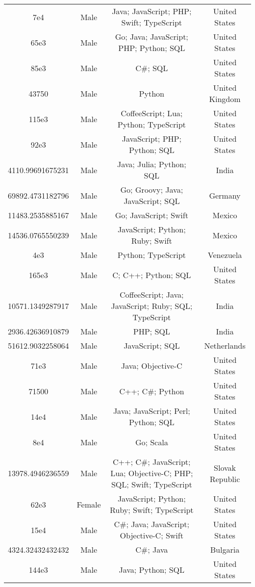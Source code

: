 \begin{center}
\begin{tabular}{ |c|c|c|c| }
7e4  &  Male  &  Java; JavaScript; PHP; Swift; TypeScript  &  United States  \\ 
65e3  &  Male  &  Go; Java; JavaScript; PHP; Python; SQL  &  United States  \\ 
85e3  &  Male  &  C\#; SQL  &  United States  \\ 
43750  &  Male  &  Python  &  United Kingdom  \\ 
115e3  &  Male  &  CoffeeScript; Lua; Python; TypeScript  &  United States  \\ 
92e3  &  Male  &  JavaScript; PHP; Python; SQL  &  United States  \\ 
4110.99691675231  &  Male  &  Java; Julia; Python; SQL  &  India  \\ 
69892.4731182796  &  Male  &  Go; Groovy; Java; JavaScript; SQL  &  Germany  \\ 
11483.2535885167  &  Male  &  Go; JavaScript; Swift  &  Mexico  \\ 
14536.0765550239  &  Male  &  JavaScript; Python; Ruby; Swift  &  Mexico  \\ 
4e3  &  Male  &  Python; TypeScript  &  Venezuela  \\ 
165e3  &  Male  &  C; C++; Python; SQL  &  United States  \\ 
10571.1349287917  &  Male  &  CoffeeScript; Java; JavaScript; Ruby; SQL; TypeScript  &  India  \\ 
2936.42636910879  &  Male  &  PHP; SQL  &  India  \\ 
51612.9032258064  &  Male  &  JavaScript; SQL  &  Netherlands  \\ 
71e3  &  Male  &  Java; Objective-C  &  United States  \\ 
71500  &  Male  &  C++; C\#; Python  &  United States  \\ 
14e4  &  Male  &  Java; JavaScript; Perl; Python; SQL  &  United States  \\ 
8e4  &  Male  &  Go; Scala  &  United States  \\ 
13978.4946236559  &  Male  &  C++; C\#; JavaScript; Lua; Objective-C; PHP; SQL; Swift; TypeScript  &  Slovak Republic  \\ 
62e3  &  Female  &  JavaScript; Python; Ruby; Swift; TypeScript  &  United States  \\ 
15e4  &  Male  &  C\#; Java; JavaScript; Objective-C; Swift  &  United States  \\ 
4324.32432432432  &  Male  &  C\#; Java  &  Bulgaria  \\ 
144e3  &  Male  &  Java; Python; SQL  &  United States  \\ 

\end{tabular}
\end{center}
